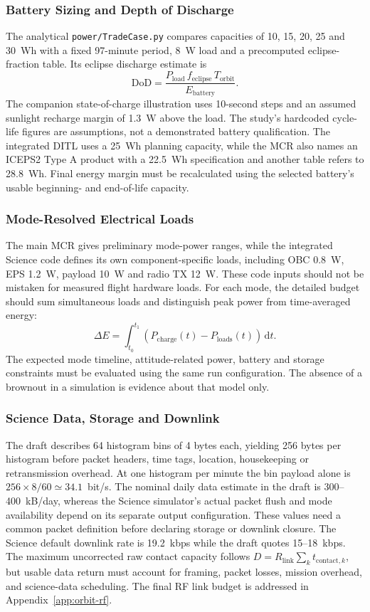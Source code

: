 \subsubsection{Battery Sizing and Depth of Discharge}\label{app:battery-trades}
The analytical \texttt{power/TradeCase.py} compares capacities of 10, 15, 20, 25 and 30~Wh with a fixed 97-minute period, 8~W load and a precomputed eclipse-fraction table. Its eclipse discharge estimate is
\begin{equation}\label{eq:tradecase-dod}\mathrm{DoD}=\frac{P_{\mathrm{load}}\,f_{\mathrm{eclipse}}\,T_{\mathrm{orbit}}}{E_{\mathrm{battery}}}.\end{equation}
The companion state-of-charge illustration uses 10-second steps and an assumed sunlight recharge margin of 1.3~W above the load. The study's hardcoded cycle-life figures are assumptions, not a demonstrated battery qualification. The integrated DITL uses a 25~Wh planning capacity, while the MCR also names an ICEPS2 Type A product with a 22.5~Wh specification and another table refers to 28.8~Wh. Final energy margin must be recalculated using the selected battery's usable beginning- and end-of-life capacity.
\subsubsection{Mode-Resolved Electrical Loads}\label{app:mode-power}
The main MCR gives preliminary mode-power ranges, while the integrated Science code defines its own component-specific loads, including OBC 0.8~W, EPS 1.2~W, payload 10~W and radio TX 12~W. These code inputs should not be mistaken for measured flight hardware loads. For each mode, the detailed budget should sum simultaneous loads and distinguish peak power from time-averaged energy:
\begin{equation}\label{eq:energy-balance}\Delta E=\int_{t_0}^{t_1}\!\left(P_{\mathrm{charge}}(t)-P_{\mathrm{loads}}(t)\right)\,\mathrm dt.\end{equation}
The expected mode timeline, attitude-related power, battery and storage constraints must be evaluated using the same run configuration. The absence of a brownout in a simulation is evidence about that model only.
\subsubsection{Science Data, Storage and Downlink}\label{app:data-budget}
The draft describes 64 histogram bins of 4 bytes each, yielding 256 bytes per histogram before packet headers, time tags, location, housekeeping or retransmission overhead. At one histogram per minute the bin payload alone is $256\times8/60\simeq34.1$~bit/s. The nominal daily data estimate in the draft is 300--400~kB/day, whereas the Science simulator's actual packet flush and mode availability depend on its separate output configuration. These values need a common packet definition before declaring storage or downlink closure.
The Science default downlink rate is 19.2~kbps while the draft quotes 15--18~kbps. The maximum uncorrected raw contact capacity follows $D=R_{\mathrm{link}}\sum_k t_{\mathrm{contact},k}$, but usable data return must account for framing, packet losses, mission overhead, and science-data scheduling. The final RF link budget is addressed in Appendix~\ref{app:orbit-rf}.
